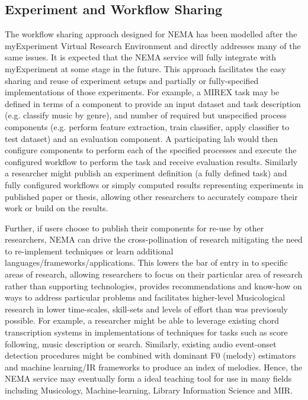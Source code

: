 \documentclass[conference]{IEEEtran}
\begin{document}
\subsection{Experiment and Workflow Sharing}
The workflow sharing approach designed for NEMA has been modelled after the myExperiment Virtual Research Environment \cite{de2007designing} and directly addresses many of the same issues. It is expected that the NEMA service will fully integrate with myExperiment at some stage in the future.  This approach facilitates the easy sharing and reuse of experiment setups and partially or fully-specified implementations of those experiments. For example, a MIREX task may be defined in terms of a component to provide an input dataset and task description (e.g. classify music by genre), and number of required but unspecified process components (e.g. perform feature extraction, train classifier, apply classifier to test dataset) and an evaluation component. A participating lab would then configure components to perform each of the specified processes and execute the configured workflow to perform the task and receive evaluation results.  Similarly a researcher might publish an experiment definition (a fully defined task) and fully configured workflows or simply computed results representing experiments in published paper or thesis, allowing other researchers to accurately compare their work or build on the results.

Further, if users choose to publish their components for re-use by other researchers, NEMA can drive the cross-pollination of research mitigating the need to re-implement techniques or learn additional languages/frameworks/applications. This lowers the bar of entry in to specific areas of research, allowing researchers to focus on their particular area of research rather than supporting technologies, provides recommendations and know-how on ways to address particular problems and facilitates higher-level Musicological research in lower time-scales, skill-sets and levels of effort than was previosuly possible.   
For example, a researcher might be able to leverage existing chord transcription systems in implementations of techniques for tasks such as score following, music description or search. Similarly, existing audio event-onset detection procedures might be combined with dominant F0 (melody) estimators and machine learning/IR frameworks to produce an index of melodies. 
Hence, the NEMA service may eventually form a ideal teaching tool for use in many fields including Musicology, Machine-learning, Library Information Science and MIR.
\end{document}
